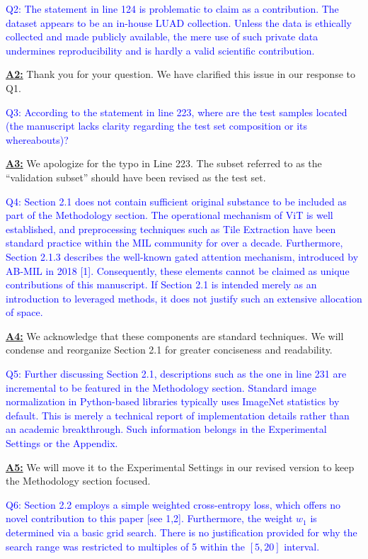 \documentclass[UTF8,12pt]{article}
\begin{document}
\textcolor{blue}{Q2: The statement in line 124 is problematic to claim as a contribution. The dataset appears to be an in-house LUAD collection. Unless the data is ethically collected and made publicly available, the mere use of such private data undermines reproducibility and is hardly a valid scientific contribution.}

\underline{{\bf A2:}} Thank you for your question. We have clarified this issue in our response to Q1.

\textcolor{blue}{Q3: According to the statement in line 223, where are the test samples located (the manuscript lacks clarity regarding the test set composition or its whereabouts)?}

\underline{{\bf A3:}} We apologize for the typo in Line 223. The subset referred to as the ``validation subset'' should have been revised as the test set.

\textcolor{blue}{Q4: Section 2.1 does not contain sufficient original substance to be included as part of the Methodology section. The operational mechanism of ViT is well established, and preprocessing techniques such as Tile Extraction have been standard practice within the MIL community for over a decade. Furthermore, Section 2.1.3 describes the well-known gated attention mechanism, introduced by AB-MIL in 2018 [1]. Consequently, these elements cannot be claimed as unique contributions of this manuscript. If Section 2.1 is intended merely as an introduction to leveraged methods, it does not justify such an extensive allocation of space.}

\underline{{\bf A4:}} We acknowledge that these components are standard techniques. We will condense and reorganize Section 2.1 for greater conciseness and readability.

\textcolor{blue}{Q5: Further discussing Section 2.1, descriptions such as the one in line 231 are incremental to be featured in the Methodology section. Standard image normalization in Python-based libraries typically uses ImageNet statistics by default. This is merely a technical report of implementation details rather than an academic breakthrough. Such information belongs in the Experimental Settings or the Appendix.}

\underline{{\bf A5:}} We will move it to the Experimental Settings in our revised version to keep the Methodology section focused.

\textcolor{blue}{Q6: Section 2.2 employs a simple weighted cross-entropy loss, which offers no novel contribution to this paper [see 1,2]. Furthermore, the weight $w_1$ is determined via a basic grid search. There is no justification provided for why the search range was restricted to multiples of 5 within the $[5, 20]$ interval.}
\end{document}
